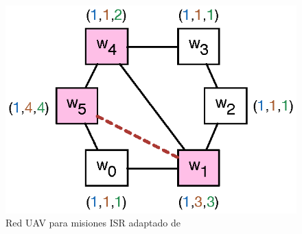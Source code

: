

\begin{figure}
\vspace{-11mm}
\centering
\includegraphics[scale=0.60]{Figs/uav.eps}\hspace{1.5em}\mbox{}
\vspace{-10mm}
\caption{Red UAV para misiones ISR adaptado de \cite{DBLP:conf/iccps/FengWHT15}} \label{fig:uav_game_map}
\end{figure}
%
